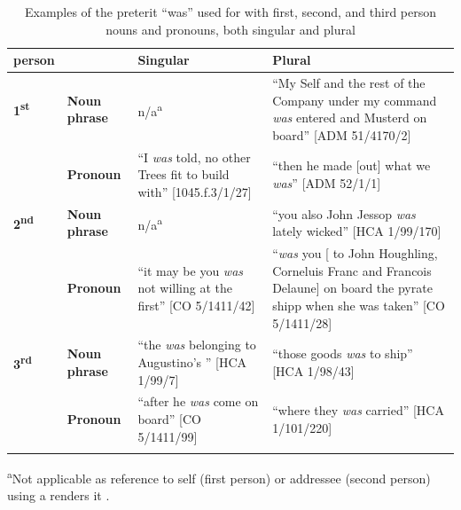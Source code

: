 \begin{table}
\caption{\label{tab:key:6.1} Examples of the preterit “was” used for with first, second, and third person nouns and pronouns, both singular and plural}
\small 
\begin{tabularx}{\textwidth}{llQQ} 
\lsptoprule
person &  & \textbf{Singular} & \textbf{Plural}\\
\midrule
 \textbf{1\textsuperscript{st}}  & \textbf{Noun phrase} & n/a\textsuperscript{a} & “My Self and the rest of the Company under my command \textit{was} entered and Musterd on board” [ADM 51/4170/2]\\
\tablevspace
& \textbf{Pronoun} & “I \textit{was} told, no other Trees fit to build with” [1045.f.3/1/27] & “then he made [out] what we \textit{was}” [ADM 52/1/1]\\

\midrule
 \textbf{2\textsuperscript{nd}}  & \textbf{Noun phrase} & n/a\textsuperscript{a} & “you also John Jessop \textit{was} lately wicked” [HCA 1/99/170]\\
\tablevspace
& \textbf{Pronoun} & “it may be you \textit{was} not willing at the first” [CO 5/1411/42] & “\textit{was} you [ to John Houghling, Corneluis Franc and Francois Delaune] on board the pyrate shipp when she was taken” [CO 5/1411/28] \\

\midrule 
 \textbf{3\textsuperscript{rd}}  & \textbf{Noun phrase} & “the  \textit{was} belonging to Augustino’s ” [HCA 1/99/7] & “those goods \textit{was} to ship” [HCA 1/98/43] \\
\tablevspace
& \textbf{Pronoun} & “after he \textit{was} come on board” [CO 5/1411/99] & “where they \textit{was} carried” [HCA 1/101/220]\\

\lspbottomrule
\end{tabularx}
\parbox{\textwidth}{\footnotesize
\textsuperscript{a}Not applicable as reference to self (first person) or addressee (second person) using a  renders it .
}

\end{table}

